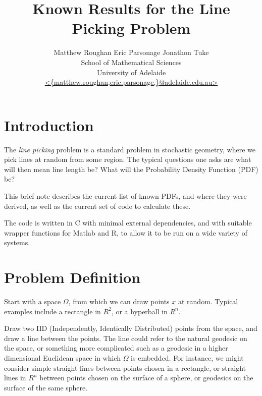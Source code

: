 \documentclass{article}
\newcommand{\titlestr}{Known Results for the Line Picking Problem}
\begin{document}
\title{\titlestr}
\author{Matthew Roughan \;\;\; Eric Parsonage \;\;\; Jonathon Tuke \\
 School of Mathematical Sciences \\
 University of Adelaide \\
 \url{ <{matthew.roughan,eric.parsonage,}@adelaide.edu.au> } }
\maketitle

\begin{abstract}

\end{abstract}

\section{Introduction}

The {\em line picking} problem is a standard problem in stochastic
geometry, where we pick lines at random from some region. The typical
questions one asks are what will then mean line length be? What will
the Probability Density Function (PDF) be?

This brief note describes the current list of known PDFs, and where
they were derived, as well as the current set of code to calculate
these. 

The code is written in C with minimal external dependencies, and with
suitable wrapper functions for Matlab and R, to allow it to be run on
a wide variety of systems.


\section{Problem Definition}

Start with a space $\Omega$, from which we can draw points $x$ at
random. Typical examples include a rectangle in $R^2$, or a hyperball
in $R^n$.

Draw two IID (Independently, Identically Distributed) points from the
space, and draw a line between the points. The line could refer to the
natural geodesic on the space, or something more complicated such as
a geodesic in a higher dimensional Euclidean space in which $\Omega$
is embedded. For instance, we might consider simple straight lines
between points chosen in a rectangle, or straight lines in $R^n$
between points chosen on the surface of a sphere, or geodesics on the
surface of the same sphere.
\end{document}
